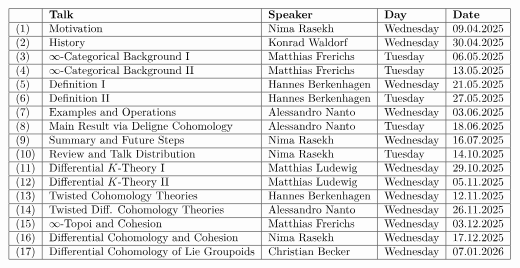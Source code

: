\documentclass[10pt]{amsart}
\begin{document}
\[
	\begin{tabular}{|l|l|l|l|l|}
		\hline 
		& \textbf{Talk} & \textbf{Speaker} & \textbf{Day} & \textbf{Date} \\ \hline 
		(1) & Motivation & Nima Rasekh & Wednesday & 09.04.2025 \\ \hline 
		(2) & History & Konrad Waldorf & Wednesday & 30.04.2025 \\ \hline
		(3) & $\infty$-Categorical Background I &	Matthias Frerichs  & Tuesday & 06.05.2025 \\ \hline
		(4) & $\infty$-Categorical Background II &	Matthias Frerichs  & Tuesday & 13.05.2025 \\ \hline
		(5) & Definition I & 	Hannes Berkenhagen & Wednesday & 21.05.2025 \\ \hline
		(6) & Definition II & Hannes Berkenhagen & Tuesday & 27.05.2025 \\ \hline 
		(7) & Examples and Operations & Alessandro Nanto & Wednesday & 03.06.2025 \\ \hline
		(8) & Main Result via Deligne Cohomology & Alessandro Nanto & Tuesday & 18.06.2025 \\ \hline
		(9) & Summary and Future Steps & Nima Rasekh & Wednesday &  16.07.2025 \\ \hline
		(10) & Review and Talk Distribution & Nima Rasekh & Tuesday & 14.10.2025 \\ \hline
  (11) & Differential $K$-Theory I & Matthias Ludewig & Wednesday & 29.10.2025 \\ \hline
		(12) &	Differential $K$-Theory II & Matthias Ludewig & Wednesday & 05.11.2025 \\ \hline
  (13) & Twisted Cohomology Theories & Hannes Berkenhagen & Wednesday & 12.11.2025 \\ \hline
  (14) & Twisted Diff. Cohomology Theories & Alessandro Nanto & Wednesday & 26.11.2025 \\ \hline
  (15) & $\infty$-Topoi and Cohesion & Matthias Frerichs & Wednesday & 03.12.2025 \\ \hline
  (16) & Differential Cohomology and Cohesion & Nima Rasekh & Wednesday & 17.12.2025 \\ \hline
  (17) & Differential Cohomology of Lie Groupoids & Christian Becker & Wednesday & 07.01.2026 \\ \hline
	\end{tabular}
\]
\end{document}
